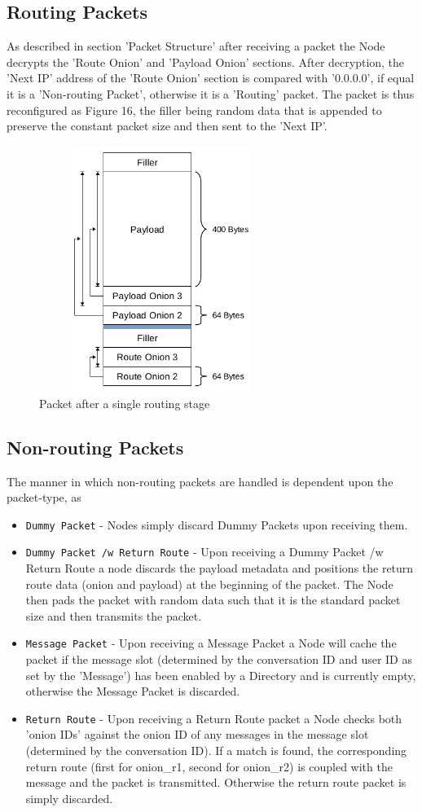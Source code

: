 \documentclass{article}
\begin{document}
\subsection{Routing Packets}
As described in section 'Packet Structure' after receiving a packet the Node decrypts the 'Route Onion' and 'Payload Onion' sections. After decryption, the 'Next IP' address of the 'Route Onion' section is compared with '0.0.0.0',
if equal it is a 'Non-routing Packet', otherwise it is a 'Routing' packet. The packet is thus reconfigured as Figure 16, the filler being random data that is appended to preserve the constant packet size and then sent to the 'Next IP'.
\begin{figure}[h]
	\centering
  	\includegraphics[width=8cm,height=8cm,keepaspectratio]{img/BasicPacketStructurePostRoute.png}
	\caption{Packet after a single routing stage}
\end{figure}
\newpage
\subsection{Non-routing Packets}
The manner in which non-routing packets are handled is dependent upon the packet-type, as 
\begin{itemize}
	\item \texttt{Dummy Packet} - Nodes simply discard Dummy Packets upon receiving them.
	\item \texttt{Dummy Packet /w Return Route} - Upon receiving a Dummy Packet /w Return Route a node discards the payload metadata and positions the return route data (onion and payload) at the beginning of the packet. The Node then pads the packet with random data such that it is the standard packet size and then transmits the packet.
	\item \texttt{Message Packet} - Upon receiving a Message Packet a Node will cache the packet if the message slot (determined by the conversation ID and user ID as set by the 'Message') has been enabled by a Directory and is currently empty, otherwise the Message Packet is discarded.
	\item \texttt{Return Route} - Upon receiving a Return Route packet a Node checks both 'onion IDs' against the onion ID of any messages in the message slot (determined by the conversation ID). If a match is found, the corresponding return route (first for onion\_r1, second for onion\_r2) is coupled with the message and the packet is transmitted. Otherwise the return route packet is simply discarded.
\end{itemize}
\end{document}
